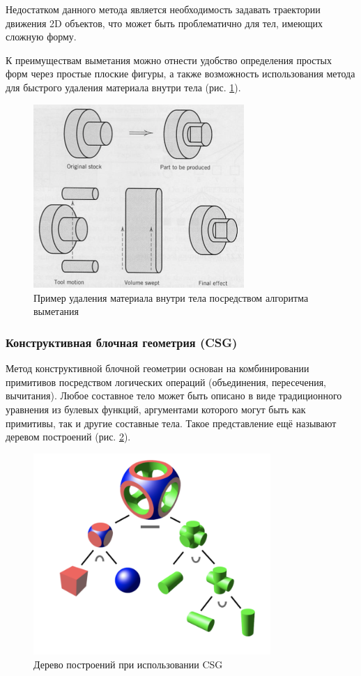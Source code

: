 Недостатком данного метода является необходимость задавать траектории движения 2D объектов, что может быть проблематично для тел, имеющих сложную форму.

К преимуществам выметания можно отнести удобство определения простых форм через простые плоские фигуры, а также возможность использования метода для быстрого удаления материала внутри тела (рис. \ref{fig:deleting}). 
\newpage
\begin{figure}[h]
	\centering
	\captionsetup{justification=centering}
	\includegraphics[width=80mm]{img/deleting.png}
	\caption{Пример удаления материала внутри тела посредством 
		алгоритма выметания}
	\label{fig:deleting}
\end{figure}


\subsubsection{Конструктивная блочная геометрия (CSG)}

Метод конструктивной блочной геометрии \cite{csg} основан на комбинировании 
примитивов посредством логических операций (объединения, пересечения, 
вычитания).
Любое составное тело может быть описано в виде традиционного 
уравнения из булевых функций, аргументами которого могут быть как 
примитивы, так и другие составные тела. 
Такое представление ещё называют 
деревом построений (рис. \ref{fig:csg}).

\begin{figure}[h]
	\centering
	\captionsetup{justification=centering}
	\includegraphics[width=90mm]{img/csg.png}
	\caption{Дерево построений при использовании CSG}
	\label{fig:csg}
\end{figure}


